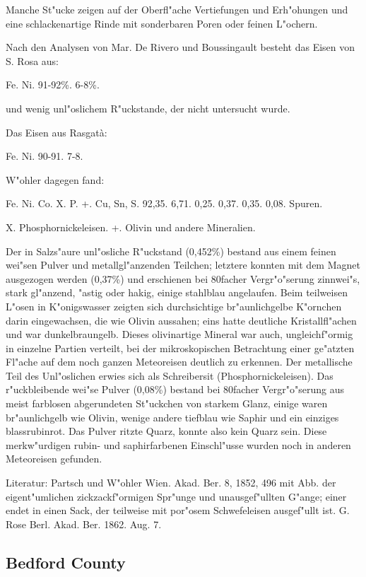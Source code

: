 \documentclass[a4paper, 11pt, oneside]{article}
\begin{document}
Manche St"ucke zeigen auf der Oberfl"ache Vertiefungen und Erh"ohungen und eine schlackenartige Rinde mit sonderbaren Poren oder feinen L"ochern.

Nach den Analysen von Mar. De Rivero und Boussingault besteht das Eisen von S. Rosa aus:

Fe. Ni.  
91-92\%.  6-8\%.

und wenig unl"oslichem R"uckstande, der nicht untersucht wurde.

Das Eisen aus Rasgatà:  

Fe. Ni.  
90-91. 7-8.

W"ohler dagegen fand:

Fe. Ni. Co. X. P. +. Cu, Sn, S.  
92,35. 6,71. 0,25. 0,37. 0,35. 0,08. Spuren.

X. Phosphornickeleisen.  
+. Olivin und andere Mineralien.

Der in Salzs"aure unl"osliche R"uckstand (0,452\%) bestand aus einem feinen wei"sen Pulver und metallgl"anzenden Teilchen; letztere konnten mit dem Magnet ausgezogen werden (0,37\%) und erschienen bei 80facher Vergr"o"serung zinnwei"s, stark gl"anzend, "astig oder hakig, einige stahlblau angelaufen. Beim teilweisen L"osen in K"onigswasser zeigten sich durchsichtige br"aunlichgelbe K"ornchen darin eingewachsen, die wie Olivin aussahen; eins hatte deutliche Kristallfl"achen und war dunkelbraungelb. Dieses olivinartige Mineral war auch, ungleichf"ormig in einzelne Partien verteilt, bei der mikroskopischen Betrachtung einer ge"atzten Fl"ache auf dem noch ganzen Meteoreisen deutlich zu erkennen. Der metallische Teil des Unl"oslichen erwies sich als Schreibersit (Phosphornickeleisen). Das r"uckbleibende wei"se Pulver (0,08\%) bestand bei 80facher Vergr"o"serung aus meist farblosen abgerundeten St"uckchen von starkem Glanz, einige waren br"aunlichgelb wie Olivin, wenige andere tiefblau wie Saphir und ein einziges blassrubinrot. Das Pulver ritzte Quarz, konnte also kein Quarz sein. Diese merkw"urdigen rubin- und saphirfarbenen Einschl"usse wurden noch in anderen Meteoreisen gefunden.

Literatur: Partsch und W"ohler Wien. Akad. Ber. 8, 1852, 496 mit Abb. der eigent"umlichen zickzackf"ormigen Spr"unge und unausgef"ullten G"ange; einer endet in einen Sack, der teilweise mit por"osem Schwefeleisen ausgef"ullt ist. G. Rose Berl. Akad. Ber. 1862. Aug. 7.

\subsection{Bedford County}
\normalsize
\end{document}
